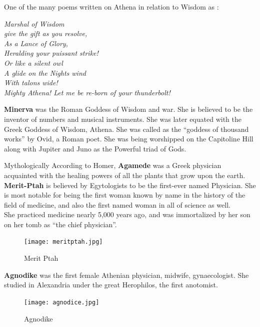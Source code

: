 \documentclass[a4paper,10pt]{article}
\begin{document}
One of the many poems written on Athena in relation to Wisdom as \cite{athena}:\\
\begin{center}
\textit{Marshal of Wisdom}\\
\textit{give the gift as you resolve,}\\
\textit{As a Lance of Glory,}\\
\textit{Heralding your puissant strike!}\\
\textit{Or like a silent owl}\\
\textit{A glide on the Nights wind}\\
\textit{With talons wide!}\\
\textit{Mighty Athena! Let me be re-born of your thunderbolt!}\\
\end{center}

\newblock
\textbf{Minerva} was the Roman Goddess of Wisdom and war. She is believed to be the inventor of numbers and musical instruments. She was later equated with the Greek Goddess of Wisdom, Athena. She was called as the “goddess of thousand works” by Ovid, a Roman poet. She was being worshipped on the Capitoline Hill along with Jupiter and Juno as the Powerful triad of Gods.

\newblock
Mythologically According to Homer, \textbf{Agamede} was a Greek physician acquainted with the healing powers of all the plants that grow upon the earth.\\

\newblock
\textbf{Merit-Ptah} is believed by Egytologists to be the first-ever named Physician. She is most notable for being the first woman known by name in the history of the field of medicine, and also the first named woman in all of science as well.\\

She practiced medicine nearly 5,000 years ago, and was immortalized by her son on her tomb as “the chief physician”\cite{merit}.
\begin{center}
\begin{figure}[h]
\centering
 \texttt{[image: meritptah.jpg]}
 \caption{Merit Ptah}
\end{figure}
\end{center}

\newblock
\textbf{Agnodike} was the first female Athenian physician, midwife, gynaecologist. She studied in Alexandria under the great Herophilos, the first anotomist.

\begin{center}
\begin{figure}[h]
\centering
 \texttt{[image: agnodice.jpg]}
 \caption{Agnodike}
\end{figure}
\end{center}
\end{document}
